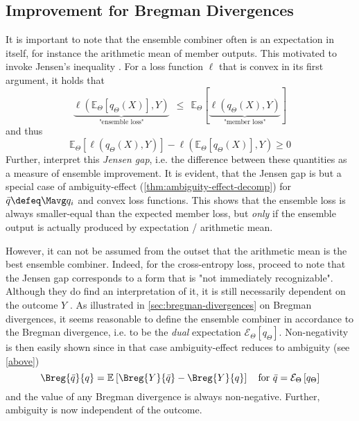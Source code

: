 \documentclass[../main.tex]{subfiles}
\begin{document}
\subsection{Improvement for Bregman Divergences}

It is important to note that the ensemble combiner often is an expectation in itself, for instance the arithmetic mean of member outputs. This motivated  to invoke Jensen's inequality
. For a loss function $\ell$ that is convex in its first argument, it holds that
$$
\underbrace{
\ell(\mathbb{E}_{\Theta}\left[ q_{\Theta}(X)\right] , Y  ) 
}_{\text{"ensemble loss"}}
~ ~ \leq ~ ~ 
\mathbb{E}_{\Theta}\left[ 
\underbrace{
\ell(q_{\Theta}(X), Y)  
}_{\text{"member loss"}}
\right]
$$
and thus
$$
\mathbb{E}_{{\Theta}}\left[ \ell (q_{\Theta}(X),Y) \right]  -
\ell(\mathbb{E}_{\Theta}\left[ q_{\Theta}(X) \right] ,Y ) \geq 0
$$
Further,  interpret this \textit{Jensen gap}, i.e. the difference between these quantities as a measure of ensemble improvement.
It is evident, that the Jensen gap is but a special case of ambiguity-effect (\ref{thm:ambiguity-effect-decomp}) for $\bar{q} \defeq \Mavg q_{i}$ and convex loss functions. 
This shows that the ensemble loss is always smaller-equal than the expected member loss, but \textit{only} if the ensemble output is actually produced by expectation / arithmetic mean. 

However, it can not be assumed from the outset that the arithmetic mean is the best ensemble combiner. Indeed, for the cross-entropy loss, \citeauthor{abe} proceed to note that the Jensen gap corresponds to a form that is "not immediately recognizable". Although they do find an interpretation of it, it is still necessarily dependent on the outcome $Y$ 
.
As illustrated in \ref{sec:bregman-divergences} on Bregman divergences, 
it seems reasonable to define the ensemble combiner in accordance to the Bregman divergence, i.e. to be the \textit{dual} expectation $\mathcal{E}_{\Theta}\left[ q_{\Theta} \right]$. 
Non-negativity is then easily shown since in that case ambiguity-effect reduces to ambiguity (see \ref{above})
$$
\Breg{\bar{q}}{q} = \mathbb{E}_{}\left[ \Breg{Y}{\bar{q}} - \Breg{Y}{q} \right]
\hspace{1em} \text{for $\bar{q} = \mathcal{E}_\Theta\left[q_\Theta\right]$}
$$ and the value of any Bregman divergence is always non-negative. Further, ambiguity is now independent of the outcome.
\end{document}
